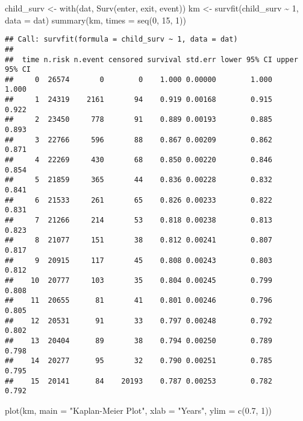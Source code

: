 \documentclass[
]{article}
\newenvironment{Shaded}{\begin{snugshade}}{\end{snugshade}}
\newcommand{\AttributeTok}[1]{\textcolor[rgb]{0.77,0.63,0.00}{#1}}
\newcommand{\DecValTok}[1]{\textcolor[rgb]{0.00,0.00,0.81}{#1}}
\newcommand{\FloatTok}[1]{\textcolor[rgb]{0.00,0.00,0.81}{#1}}
\newcommand{\FunctionTok}[1]{\textcolor[rgb]{0.00,0.00,0.00}{#1}}
\newcommand{\NormalTok}[1]{#1}
\newcommand{\OtherTok}[1]{\textcolor[rgb]{0.56,0.35,0.01}{#1}}
\newcommand{\SpecialCharTok}[1]{\textcolor[rgb]{0.00,0.00,0.00}{#1}}
\newcommand{\StringTok}[1]{\textcolor[rgb]{0.31,0.60,0.02}{#1}}
\begin{document}
\begin{Shaded}
\begin{Highlighting}[]
\NormalTok{child\_surv }\OtherTok{\textless{}{-}} \FunctionTok{with}\NormalTok{(dat, }\FunctionTok{Surv}\NormalTok{(enter, exit, event))}
\NormalTok{km }\OtherTok{\textless{}{-}} \FunctionTok{survfit}\NormalTok{(child\_surv }\SpecialCharTok{\textasciitilde{}} \DecValTok{1}\NormalTok{, }\AttributeTok{data =}\NormalTok{ dat)}
\FunctionTok{summary}\NormalTok{(km, }\AttributeTok{times =} \FunctionTok{seq}\NormalTok{(}\DecValTok{0}\NormalTok{, }\DecValTok{15}\NormalTok{, }\DecValTok{1}\NormalTok{))}
\end{Highlighting}
\end{Shaded}

\begin{verbatim}
## Call: survfit(formula = child_surv ~ 1, data = dat)
## 
##  time n.risk n.event censored survival std.err lower 95% CI upper 95% CI
##     0  26574       0        0    1.000 0.00000        1.000        1.000
##     1  24319    2161       94    0.919 0.00168        0.915        0.922
##     2  23450     778       91    0.889 0.00193        0.885        0.893
##     3  22766     596       88    0.867 0.00209        0.862        0.871
##     4  22269     430       68    0.850 0.00220        0.846        0.854
##     5  21859     365       44    0.836 0.00228        0.832        0.841
##     6  21533     261       65    0.826 0.00233        0.822        0.831
##     7  21266     214       53    0.818 0.00238        0.813        0.823
##     8  21077     151       38    0.812 0.00241        0.807        0.817
##     9  20915     117       45    0.808 0.00243        0.803        0.812
##    10  20777     103       35    0.804 0.00245        0.799        0.808
##    11  20655      81       41    0.801 0.00246        0.796        0.805
##    12  20531      91       33    0.797 0.00248        0.792        0.802
##    13  20404      89       38    0.794 0.00250        0.789        0.798
##    14  20277      95       32    0.790 0.00251        0.785        0.795
##    15  20141      84    20193    0.787 0.00253        0.782        0.792
\end{verbatim}

\begin{Shaded}
\begin{Highlighting}[]
\FunctionTok{plot}\NormalTok{(km, }\AttributeTok{main =} \StringTok{"Kaplan{-}Meier Plot"}\NormalTok{, }\AttributeTok{xlab =} \StringTok{"Years"}\NormalTok{, }\AttributeTok{ylim =} \FunctionTok{c}\NormalTok{(}\FloatTok{0.7}\NormalTok{, }\DecValTok{1}\NormalTok{))}
\end{Highlighting}
\end{Shaded}
\end{document}
